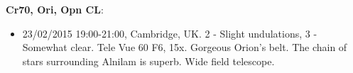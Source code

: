 {\bf Cr70, Ori, Opn CL}:
\begin{itemize}
\item 23/02/2015 19:00-21:00, Cambridge, UK. 2 - Slight undulations, 3 - Somewhat clear. Tele Vue 60 F6, 15x. Gorgeous Orion's belt. The chain of stars surrounding Alnilam is superb. Wide field telescope.
\end{itemize}
